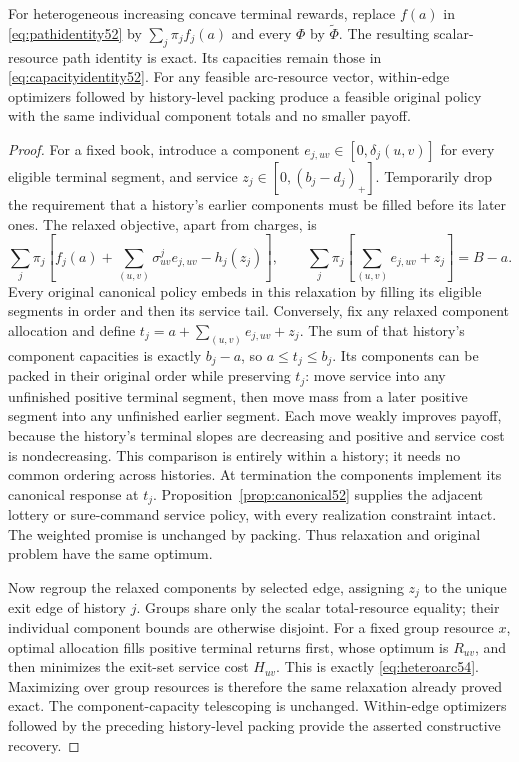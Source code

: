 \begin{theorem}\label{thm:packing54}
For heterogeneous increasing concave terminal rewards, replace $f(a)$ in \eqref{eq:pathidentity52} by $\sum_j\pi_jf_j(a)$ and every $\Phi$ by $\widetilde\Phi$. The resulting scalar-resource path identity is exact. Its capacities remain those in \eqref{eq:capacityidentity52}. For any feasible arc-resource vector, within-edge optimizers followed by history-level packing produce a feasible original policy with the same individual component totals and no smaller payoff.
\end{theorem}
\begin{proof}
For a fixed book, introduce a component $e_{j,uv}\in[0,\delta_j(u,v)]$ for every eligible terminal segment, and service $z_j\in[0,(b_j-d_j)_+]$. Temporarily drop the requirement that a history's earlier components must be filled before its later ones. The relaxed objective, apart from charges, is
\[
 \sum_j\pi_j\left[f_j(a)+\sum_{(u,v)}\sigma^j_{uv}e_{j,uv}-h_j(z_j)\right],
 \qquad \sum_j\pi_j\left[\sum_{(u,v)}e_{j,uv}+z_j\right]=B-a.
\]
Every original canonical policy embeds in this relaxation by filling its eligible segments in order and then its service tail. Conversely, fix any relaxed component allocation and define
$t_j=a+\sum_{(u,v)}e_{j,uv}+z_j$.
The sum of that history's component capacities is exactly $b_j-a$, so $a\leq t_j\leq b_j$. Its components can be packed in their original order while preserving $t_j$: move service into any unfinished positive terminal segment, then move mass from a later positive segment into any unfinished earlier segment. Each move weakly improves payoff, because the history's terminal slopes are decreasing and positive and service cost is nondecreasing. This comparison is entirely within a history; it needs no common ordering across histories. At termination the components implement its canonical response at $t_j$. Proposition~\ref{prop:canonical52} supplies the adjacent lottery or sure-command service policy, with every realization constraint intact. The weighted promise is unchanged by packing. Thus relaxation and original problem have the same optimum.

Now regroup the relaxed components by selected edge, assigning $z_j$ to the unique exit edge of history $j$. Groups share only the scalar total-resource equality; their individual component bounds are otherwise disjoint. For a fixed group resource $x$, optimal allocation fills positive terminal returns first, whose optimum is $R_{uv}$, and then minimizes the exit-set service cost $H_{uv}$. This is exactly \eqref{eq:heteroarc54}. Maximizing over group resources is therefore the same relaxation already proved exact. The component-capacity telescoping is unchanged. Within-edge optimizers followed by the preceding history-level packing provide the asserted constructive recovery.
\end{proof}

